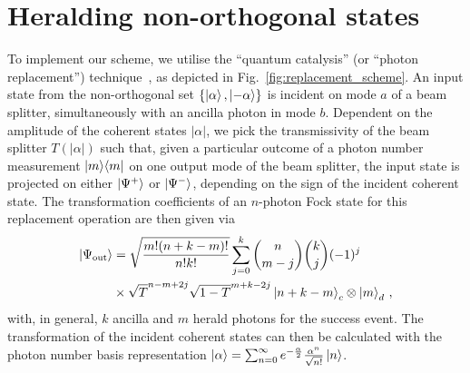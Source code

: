 \documentclass[aps,prl,twocolumn, superscriptaddress]{revtex4-1}
\begin{document}
\section{Heralding non-orthogonal states}
To implement our scheme, we utilise the ``quantum catalysis'' (or ``photon replacement'') technique~\cite{lvovsky_quantum-optical_2002, sanaka_filtering_2006, bartley_multiphoton_2012}, as depicted in Fig.~\ref{fig:replacement_scheme}. An input state from the non-orthogonal set $\{\ket{\alpha},\ket{-\alpha}\}$ is incident on mode $a$ of a beam splitter, simultaneously with an ancilla photon in mode $b$. Dependent on the amplitude of the coherent states $|\alpha|$, we pick the transmissivity of the beam splitter $T\left(|\alpha|\right)$ such that, given a particular outcome of a photon number measurement $\ket{m}\!\bra{m}$ on one output mode of the beam splitter, the input state is projected on either $\ket{\Psi^+}$ or $\ket{\Psi^-}$, depending on the sign of the incident coherent state.
The transformation coefficients of an $n$-photon Fock state for this replacement operation are then given via
%
\begin{equation}
\begin{aligned}
\ket{\Psi_\mathrm{out}}&=\sqrt{\frac{m!(n+k-m)!}{n!k!}}\sum_{j=0}^{k} \binom{n}{m-j} \binom{k}{j} (-1)^j \\
&\times\sqrt{T}^{n-m+2j}\sqrt{1-T}^{m+k-2j} \ket{n+k-m}_c\otimes \ket{m}_d\, ,
\end{aligned}
\end{equation}
%
with, in general,  $k$ ancilla and $m$ herald photons for the success event. The transformation of the incident coherent states can then be calculated with the photon number basis representation $\ket{\alpha}=\sum_{n=0}^{\infty}e^{-\frac{\alpha}{2}}\frac{\alpha^n}{\sqrt{n!}}\ket{n}$.
\end{document}
